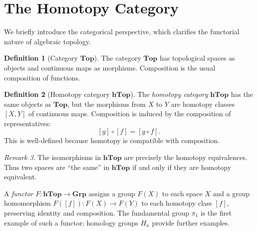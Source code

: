 \documentclass[12pt,a4paper,openany]{book}
\theoremstyle{definition}
\newtheorem{definition}{Definition}[chapter]
\theoremstyle{plain}
\theoremstyle{remark}
\newtheorem{remark}[definition]{Remark}
\begin{document}
\section{The Homotopy Category}\label{sec:homotopy-category}

We briefly introduce the categorical perspective, which clarifies the
functorial nature of algebraic topology.

\begin{definition}[Category $\mathbf{Top}$]\label{def:category-Top}
The category $\mathbf{Top}$ has topological
spaces as objects and continuous maps as morphisms. Composition is the usual
composition of functions.
\end{definition}

\begin{definition}[Homotopy category $\mathbf{hTop}$]\label{def:category-hTop}
The \emph{homotopy category} $\mathbf{hTop}$ has the
same objects as $\mathbf{Top}$, but the morphisms from $X$ to $Y$ are homotopy
classes $[X, Y]$ of continuous maps. Composition is induced by the composition
of representatives:
\[
  [g] \circ [f] = [g \circ f].
\]
This is well-defined because homotopy is compatible with composition.
\end{definition}

\begin{remark}\label{rem:hTop-isomorphisms}
The isomorphisms in $\mathbf{hTop}$ are precisely the homotopy equivalences.
Thus two spaces are ``the same'' in $\mathbf{hTop}$ if and only if they are
homotopy equivalent.
\end{remark}

A \emph{functor} $F \colon \mathbf{hTop} \to \mathbf{Grp}$
assigns a group $F(X)$ to each space $X$ and a group homomorphism $F([f])
\colon F(X) \to F(Y)$ to each homotopy class $[f]$, preserving identity and
composition. The fundamental group $\pi_1$ is the first example of such a
functor; homology groups $H_n$ provide further examples.

\begin{center}
\qquad
{}
\label{fig:functor-diagram}
\end{center}
\end{document}
